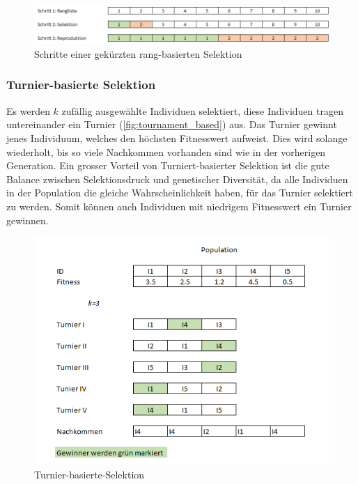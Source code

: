         \begin{figure}[H]
          \includegraphics[width=\textwidth,center]{graphics/truncated_rank_based_selection}
          \caption{Schritte einer gekürzten rang-basierten Selektion\label{fig:truncated_rank_based_selection}}
        \end{figure}

      \subsubsection{Turnier-basierte Selektion\label{subsub:Turnier}}

        Es werden \(k\) zufällig ausgewählte Individuen selektiert,
        diese Individuen tragen untereinander ein Turnier (\vref{fig:tournament_based}) aus.
        Das Turnier gewinnt jenes Individuum, welches den höchsten Fitnesswert aufweist.
        Dies wird solange wiederholt, bis so viele Nachkommen vorhanden sind wie in der vorherigen Generation.
        Ein grosser Vorteil von Turniert-basierter Selektion ist die gute Balance zwischen
        Selektionsdruck und genetischer Diversität,
        da alle Individuen in der Population die gleiche Wahrscheinlichkeit haben, für das Turnier selektiert zu werden.
        Somit können auch Individuen mit niedrigem Fitnesswert ein Turnier gewinnen.

        \begin{figure}[H]
          \includegraphics[scale=1,center]{graphics/tournament_based}
          \caption{Turnier-basierte-Selektion\label{fig:tournament_based}}
        \end{figure}

